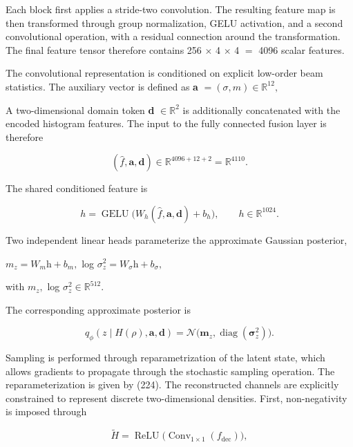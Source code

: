 Each block first applies a stride-two convolution. The resulting feature map is then transformed through group normalization, GELU activation, and a second convolutional operation, with a residual connection around the transformation. The final feature tensor therefore contains 256 \(\times\) 4 \(\times\) 4 \ensuremath{=} 4096 scalar features.

The convolutional representation is conditioned on explicit low-order beam statistics. The auxiliary vector is defined as \textbf{a} \(= ( \sigma , m ) \in \mathbb{R}^{12} ,\)

A two-dimensional domain token \textbf{d} \(\in \mathbb{R}^{2}\) is additionally concatenated with the encoded histogram features. The input to the fully connected fusion layer is therefore

\[ (\widehat f,\mathbf a,\mathbf d)\in\mathbb R^{4096+12+2}=\mathbb R^{4110}.\]

The shared conditioned feature is

\begin{equation}
\label{eq:142}
h=\operatorname{GELU}\bigl(W_h(\widehat f,\mathbf a,\mathbf d)+b_h\bigr),\qquad h\in\mathbb R^{1024}.
\end{equation}

Two independent linear heads parameterize the approximate Gaussian posterior,

\(m_{z} = W_{m} \mathrm{h} + b_{m} ,\) log \(\sigma_{z}^{2} = W_{\sigma} \mathrm{h} + b_{\sigma} ,\)

with \(m_{z} ,\) log \(\sigma_{z}^{2} \in \mathbb{R}^{512} .\)

The corresponding approximate posterior is

\begin{equation}
\label{eq:143}
q_{\phi}(z\mid H(\rho),\mathbf a,\mathbf d)=\mathcal N\bigl(\mathbf m_z,\operatorname{diag}(\boldsymbol\sigma_z^2)\bigr).
\end{equation}

Sampling is performed through reparametrization of the latent state, which allows gradients to propagate through the stochastic sampling operation. The reparameterization is given by (224). The reconstructed channels are explicitly constrained to represent discrete two-dimensional densities. First, non-negativity is imposed through

\begin{equation}
\label{eq:144}
\widetilde H=\operatorname{ReLU}\bigl(\operatorname{Conv}_{1\times1}(f_{\mathrm{dec}})\bigr),
\end{equation}

